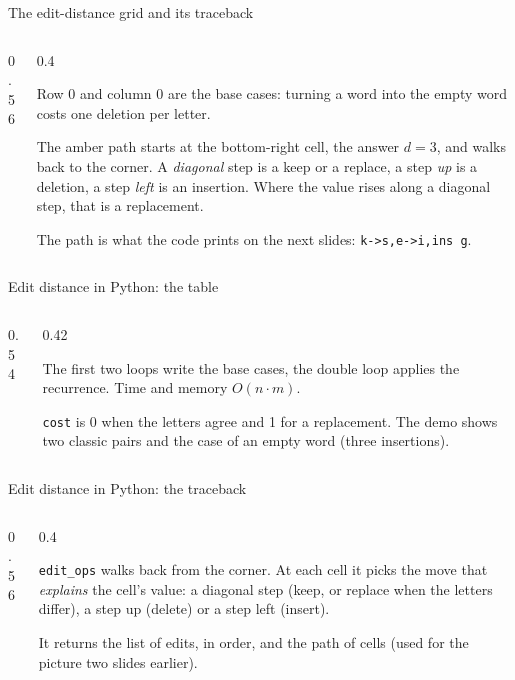 \documentclass[aspectratio=169,10pt]{beamer}
\newcommand{\figtab}[2][0.5]{\begin{sfig}[#1]\end{sfig}}
\begin{document}
\begin{frame}{The edit-distance grid and its traceback}
\begin{columns}[T]
\begin{column}{0.56\textwidth}
\figtab[0.8]{fig_edit}
\end{column}
\begin{column}{0.4\textwidth}
{\small
Row 0 and column 0 are the base cases: turning a word into the empty word costs one deletion per letter.

\vspace{2mm}
The \colorbox{tdAmber!40}{amber path} starts at the bottom-right cell, the answer $d=3$, and walks back to the corner. A \emph{diagonal} step is a keep or a replace, a step \emph{up} is a deletion, a step \emph{left} is an insertion. Where the value rises along a diagonal step, that is a replacement.

\vspace{2mm}
The path is what the code prints on the next slides: \texttt{k->s,e->i,ins g}.}
\end{column}
\end{columns}
\end{frame}

\begin{frame}{Edit distance in Python: the table}
\begin{columns}[T]
\begin{column}{0.54\textwidth}
\end{column}
\begin{column}{0.42\textwidth}
\vspace{2mm}
{\small
The first two loops write the base cases, the double loop applies the recurrence. Time and memory $O(n\cdot m)$.

\vspace{2mm}
\texttt{cost} is 0 when the letters agree and 1 for a replacement. The demo shows two classic pairs and the case of an empty word (three insertions).}
\end{column}
\end{columns}
\end{frame}

\begin{frame}{Edit distance in Python: the traceback}
\begin{columns}[T]
\begin{column}{0.56\textwidth}
\pycode[\fontsize{7.8}{9.2}\selectfont]{edit_ops}
\end{column}
\begin{column}{0.4\textwidth}
{\small
\texttt{edit\_ops} walks back from the corner. At each cell it picks the move that \emph{explains} the cell's value: a diagonal step (keep, or replace when the letters differ), a step up (delete) or a step left (insert).

\vspace{2mm}
It returns the list of edits, in order, and the path of cells (used for the picture two slides earlier).}
\end{column}
\end{columns}
\end{frame}
\end{document}
